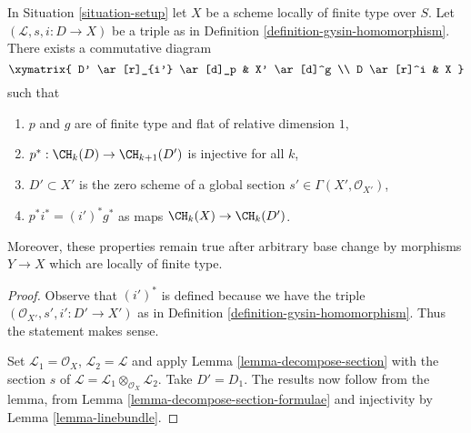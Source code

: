 \begin{lemma}
\label{lemma-normal-cone-effective-Cartier}
In Situation \ref{situation-setup} let $X$ be a scheme locally
of finite type over $S$. Let $(\mathcal{L}, s, i : D \to X)$
be a triple as in Definition \ref{definition-gysin-homomorphism}.
There exists a commutative diagram
$$
\xymatrix{
D' \ar[r]_{i'} \ar[d]_p & X' \ar[d]^g \\
D \ar[r]^i & X
}
$$
such that
\begin{enumerate}
\item $p$ and $g$ are of finite type and flat of relative dimension $1$,
\item $p^* : \CH_k(D) \to \CH_{k + 1}(D')$ is injective for all $k$,
\item $D' \subset X'$ is the zero scheme of a global section
$s' \in \Gamma(X', \mathcal{O}_{X'})$,
\item $p^*i^* = (i')^*g^*$ as maps $\CH_k(X) \to \CH_k(D')$.
\end{enumerate}
Moreover, these properties remain true after arbitrary base change
by morphisms $Y \to X$ which are locally of finite type.
\end{lemma}

\begin{proof}
Observe that $(i')^*$ is defined because we have the triple
$(\mathcal{O}_{X'}, s', i' : D' \to X')$ as in
Definition \ref{definition-gysin-homomorphism}. Thus the statement makes sense.

\medskip\noindent
Set $\mathcal{L}_1 = \mathcal{O}_X$, $\mathcal{L}_2 = \mathcal{L}$
and apply Lemma \ref{lemma-decompose-section} with the section $s$ of
$\mathcal{L} = \mathcal{L}_1 \otimes_{\mathcal{O}_X} \mathcal{L}_2$.
Take $D' = D_1$. The results now follow from the lemma, from
Lemma \ref{lemma-decompose-section-formulae}
and injectivity by
Lemma \ref{lemma-linebundle}.
\end{proof}

